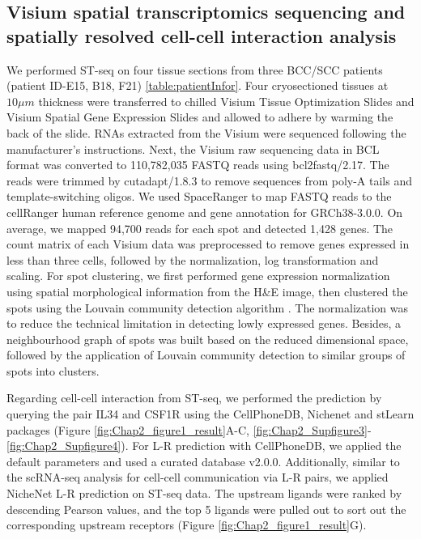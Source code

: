 \subsection{Visium spatial transcriptomics sequencing and spatially resolved cell-cell interaction analysis}
We performed ST-seq on four tissue sections from three BCC/SCC patients (patient ID-E15, B18, F21) \ref{table:patientInfor}. Four cryosectioned tissues at $10\mu m$ thickness were transferred to chilled Visium Tissue Optimization Slides and Visium Spatial Gene Expression Slides and allowed to adhere by warming the back of the slide. RNAs extracted from the Visium were sequenced following the manufacturer’s instructions. Next, the Visium raw sequencing data in BCL format was converted to 110,782,035 FASTQ reads using bcl2fastq/2.17. The reads were trimmed by cutadapt/1.8.3 to remove sequences from poly-A tails and template-switching oligos. We used SpaceRanger to map FASTQ reads to the cellRanger human reference genome and gene annotation for GRCh38-3.0.0. On average, we mapped 94,700 reads for each spot and detected 1,428 genes. The count matrix of each Visium data was preprocessed to remove genes expressed in less than three cells, followed by the normalization, log transformation and scaling. For spot clustering, we first performed gene expression normalization using spatial morphological information from the H\&E image, then clustered the spots using the Louvain community detection algorithm \cite{pham2020stlearn}. The normalization was to reduce the technical limitation in detecting lowly expressed genes. Besides, a neighbourhood graph of spots was built based on the reduced dimensional space, followed by the application of Louvain community detection to similar groups of spots into clusters. 

Regarding cell-cell interaction from ST-seq, we performed the prediction by querying the pair IL34 and CSF1R using the CellPhoneDB, Nichenet and stLearn packages \cite{pham2020stlearn, efremova2020cellphonedb, browaeys2020nichenet} (Figure \ref{fig:Chap2_figure1_result}A-C, \ref{fig:Chap2_Supfigure3}-\ref{fig:Chap2_Supfigure4}). For L-R prediction with CellPhoneDB, we applied the default parameters \cite{browaeys2020nichenet, efremova2020cellphonedb} and used a curated database v2.0.0. Additionally, similar to the scRNA-seq analysis for cell-cell communication via L-R pairs, we applied NicheNet L-R prediction on ST-seq data. The upstream ligands were ranked by descending Pearson values, and the top 5 ligands were pulled out to sort out the corresponding upstream receptors (Figure \ref{fig:Chap2_figure1_result}G).  


